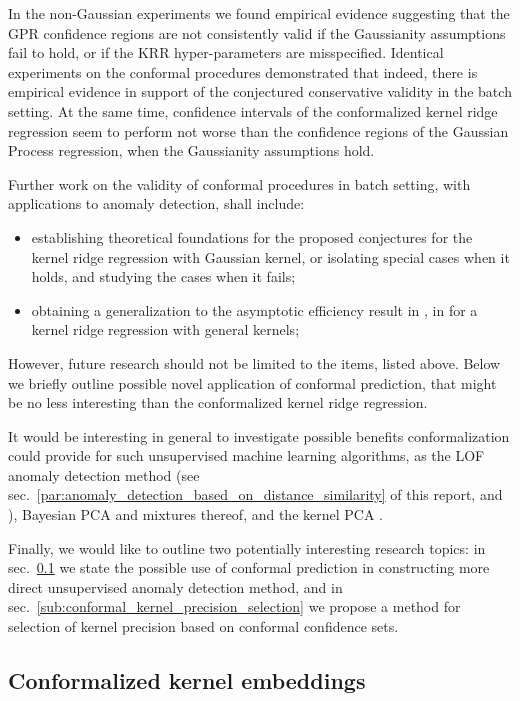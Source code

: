 \documentclass[a4paper,14pt]{extarticle}
\begin{document}
In the non-Gaussian experiments we found empirical evidence suggesting that the GPR
confidence regions are not consistently valid if the Gaussianity assumptions fail
to hold, or if the KRR hyper-parameters are misspecified. Identical experiments on
the conformal procedures demonstrated that indeed, there is empirical evidence in
support of the conjectured conservative validity in the batch setting. At the same
time, confidence intervals of the conformalized kernel ridge regression seem to
perform not worse than the confidence regions of the Gaussian Process regression,
when the Gaussianity assumptions hold.

Further work on the validity of conformal procedures in batch setting, with applications
to anomaly detection, shall include: \begin{itemize}
  \item establishing theoretical foundations for the proposed conjectures for the
  kernel ridge regression with Gaussian kernel, or isolating special cases when it
  holds, and studying the cases when it fails;
  \item obtaining a generalization to the asymptotic efficiency result in \cite{burnaevV14},
  in for a kernel ridge regression with general kernels;
\end{itemize}

However, future research should not be limited to the items, listed above. Below we
briefly outline possible novel application of conformal prediction, that might be
no less interesting than the conformalized kernel ridge regression.

It would be interesting in general to investigate possible benefits conformalization
could provide for such unsupervised machine learning algorithms, as the LOF anomaly
detection method (see sec.~\ref{par:anomaly_detection_based_on_distance_similarity}
of this report, and \cite{breunig2000}), Bayesian PCA \cite{tippnigbishop1999} and
mixtures thereof, and the kernel PCA \cite{hoffmann2007}.

Finally, we would like to outline two potentially interesting research topics: in
sec.~\ref{sub:conformalized_kernel_embeddings} we state the possible use of conformal
prediction in constructing more direct unsupervised anomaly detection method, and
in sec.~\ref{sub:conformal_kernel_precision_selection} we propose a method for selection
of kernel precision based on conformal confidence sets.

\subsection{Conformalized kernel embeddings} %
\label{sub:conformalized_kernel_embeddings}
\end{document}
